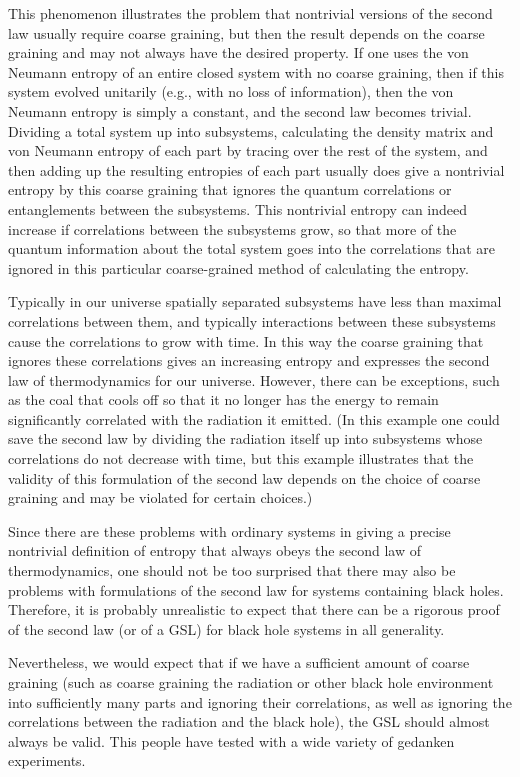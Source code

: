 \documentclass[12pt]{article} \usepackage{latexsym} \textwidth 15cm
\begin{document}
This phenomenon illustrates the problem that nontrivial versions of
the second law usually require coarse graining, but then the result
depends on the coarse graining and may not always have the desired
property.  If one uses the von Neumann entropy of an entire closed
system with no coarse graining, then if this system evolved unitarily
(e.g., with no loss of information), then the von Neumann entropy is
simply a constant, and the second law becomes trivial.  Dividing a
total system up into subsystems, calculating the density matrix and
von Neumann entropy of each part by tracing over the rest of the
system, and then adding up the resulting entropies of each part
usually does give a nontrivial entropy by this coarse graining that
ignores the quantum correlations or entanglements between the
subsystems.  This nontrivial entropy can indeed increase if
correlations between the subsystems grow, so that more of the quantum
information about the total system goes into the correlations that are
ignored in this particular coarse-grained method of calculating the
entropy.

Typically in our universe spatially separated subsystems have less
than maximal correlations between them, and typically interactions
between these subsystems cause the correlations to grow with time.  In
this way the coarse graining that ignores these correlations gives an
increasing entropy and expresses the second law of thermodynamics for
our universe.  However, there can be exceptions, such as the coal that
cools off so that it no longer has the energy to remain significantly
correlated with the radiation it emitted.  (In this example one could
save the second law by dividing the radiation itself up into
subsystems whose correlations do not decrease with time, but this
example illustrates that the validity of this formulation of the
second law depends on the choice of coarse graining and may be
violated for certain choices.)

Since there are these problems with ordinary systems in giving a
precise nontrivial definition of entropy that always obeys the second
law of thermodynamics, one should not be too surprised that there may
also be problems with formulations of the second law for systems
containing black holes.  Therefore, it is probably unrealistic to
expect that there can be a rigorous proof of the second law (or of a
GSL) for black hole systems in all generality.

Nevertheless, we would expect that if we have a sufficient amount of
coarse graining (such as coarse graining the radiation or other black
hole environment into sufficiently many parts and ignoring their
correlations, as well as ignoring the correlations between the
radiation and the black hole), the GSL should almost always be valid.
This people have tested with a wide variety of gedanken experiments.
\end{document}
